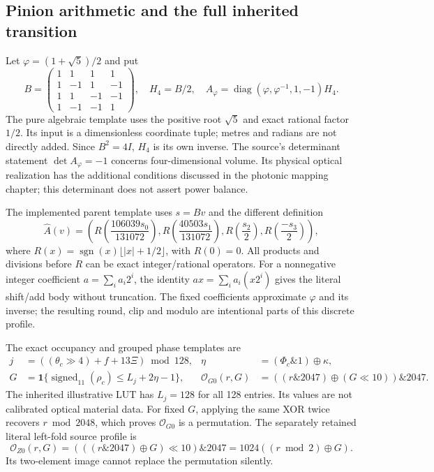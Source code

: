 \subsection{Pinion arithmetic and the full inherited transition}
Let $\varphi=(1+\sqrt5)/2$ and put
\begin{equation}
 B=\begin{pmatrix}1&1&1&1\\1&-1&1&-1\\1&1&-1&-1\\1&-1&-1&1\end{pmatrix},
 \quad H_4=B/2,\quad
 A_\varphi=\operatorname{diag}(\varphi,\varphi^{-1},1,-1)H_4.
\end{equation}
The pure algebraic template uses the positive root $\sqrt5$ and exact
rational factor $1/2$. Its input is a dimensionless coordinate tuple; metres
and radians are not directly added. Since $B^2=4I$, $H_4$ is its own inverse.
The source's determinant statement $\det A_\varphi=-1$ concerns four-dimensional
volume. Its physical optical realization has the additional conditions discussed
in the photonic mapping chapter; this determinant does not assert power balance.

The implemented parent template uses $s=Bv$ and the different definition
\begin{equation}
 \widehat A(v)=\left(
 R\left(\frac{106039s_0}{131072}\right),
 R\left(\frac{40503s_1}{131072}\right),
 R\left(\frac{s_2}{2}\right),
 R\left(\frac{-s_3}{2}\right)\right),
\end{equation}
where $R(x)=\operatorname{sgn}(x)\lfloor|x|+1/2\rfloor$, with $R(0)=0$.
All products and divisions before $R$ can be exact integer/rational operators.
For a nonnegative integer coefficient $a=\sum_i a_i2^i$, the identity
$ax=\sum_i a_i(x2^i)$ gives the literal shift/add body without truncation.
The fixed coefficients approximate $\varphi$ and its inverse; the resulting
round, clip and modulo are intentional parts of this discrete profile.

The exact occupancy and grouped phase templates are
\begin{align}
 j&=((\theta_c\gg4)+f+13\Xi)\bmod128,
 &\eta&=(\Phi_c\mathbin{\&}1)\oplus\kappa,\\
 G&=\boldsymbol1\{\operatorname{signed}_{11}(\rho_c)\le L_j+2\eta-1\},
 &\mathcal O_{G0}(r,G)&=((r\mathbin{\&}2047)\oplus(G\ll10))\mathbin{\&}2047.
\end{align}
The inherited illustrative LUT has $L_j=128$ for all 128 entries. Its values
are not calibrated optical material data. For fixed $G$, applying the same
XOR twice recovers $r\bmod2048$, which proves $\mathcal O_{G0}$ is a permutation.
The separately retained literal left-fold source profile is
\[
 \mathcal O_{Z0}(r,G)=(((r\mathbin{\&}2047)\oplus G)\ll10)\mathbin{\&}2047
                   =1024((r\bmod2)\oplus G).
\]
Its two-element image cannot replace the permutation silently.

